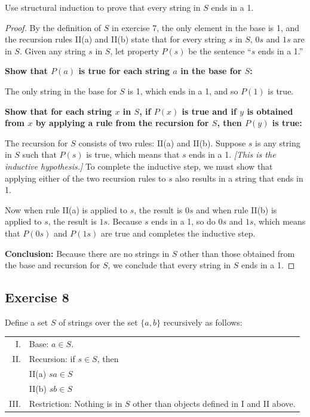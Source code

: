 \documentclass[14pt]{extarticle}
\begin{document}
Use structural induction to prove that every string in $S$ ends in a 1.

\begin{proof}
By the definition of $S$ in exercise 7, the only element in the base is 1, and the recursion rules II(a) and II(b) 
state that for every string $s$ in $S$, $0s$ and $1s$ are in $S$. Given any string $s$ in $S$, let property $P(s)$ be 
the sentence “$s$ ends in a 1.” 

{\bf Show that $P(a)$ is true for each string $a$ in the base for $S$:}

The only string in the base for $S$ is 1, which ends in a 1, and so $P(1)$ is true. 

{\bf Show that for each string $x$ in $S$, if $P(x)$ is true and if $y$ is obtained from $x$ by applying a rule 
from the recursion for $S$, then $P(y)$ is true:}

The recursion for $S$ consists of two rules: II(a) and II(b). Suppose $s$ is any string in $S$ such that $P(s)$ is 
true, which means that $s$ ends in a 1. {\it [This is the inductive hypothesis.]} To complete the inductive step, we 
must show that applying either of the two recursion rules to $s$ also results in a string that ends in 1. 

Now when rule II(a) is applied to $s$, the result is $0s$ and when rule II(b) is applied to $s$, the result is $1s$. 
Because $s$ ends in a 1, so do $0s$ and $1s$, which means that $P(0s)$ and $P(1s)$ are true and completes the 
inductive step. 

{\bf Conclusion:} Because there are no strings in $S$ other than those obtained from the base and recursion for 
$S$, we conclude that every string in $S$ ends in a 1.
\end{proof}

\subsection{Exercise 8}
Define a set $S$ of strings over the set \(\{a, b\}\) recursively as follows:

\begin{tabular}{rl}
I. & Base: $a \in S$. \\
II. & Recursion: if $s \in S$, then \\
    & II(a) $sa \in S$ \\
    & II(b) $sb \in S$ \\
III. & Restriction: Nothing is in $S$ other than objects defined in I and II above.
\end{tabular}
\end{document}
